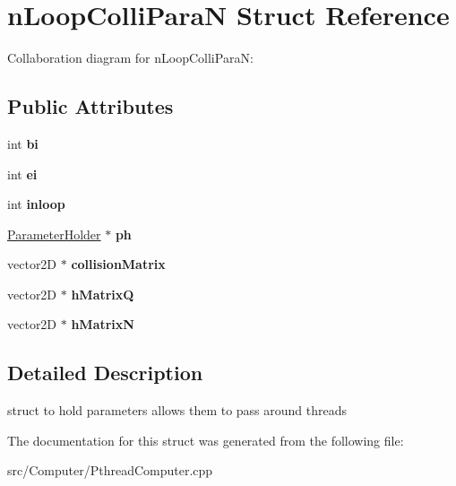 \hypertarget{structnLoopColliParaN}{}\section{n\+Loop\+Colli\+ParaN Struct Reference}
\label{structnLoopColliParaN}


Collaboration diagram for n\+Loop\+Colli\+ParaN\+:
\subsection*{Public Attributes}
\begin{DoxyCompactItemize}
\item 
int {\bfseries bi}\hypertarget{structnLoopColliParaN_acfc0b729c610194a24ee51c3a5d045ce}{}\label{structnLoopColliParaN_acfc0b729c610194a24ee51c3a5d045ce}

\item 
int {\bfseries ei}\hypertarget{structnLoopColliParaN_a264ebf490197649c079bdf6c83507898}{}\label{structnLoopColliParaN_a264ebf490197649c079bdf6c83507898}

\item 
int {\bfseries inloop}\hypertarget{structnLoopColliParaN_a76c7f95e90155290437f87b417b1e4f3}{}\label{structnLoopColliParaN_a76c7f95e90155290437f87b417b1e4f3}

\item 
\hyperlink{structParameterHolder}{Parameter\+Holder} $\ast$ {\bfseries ph}\hypertarget{structnLoopColliParaN_a45f735b665c7590f117a84f88bcb8cba}{}\label{structnLoopColliParaN_a45f735b665c7590f117a84f88bcb8cba}

\item 
vector2D $\ast$ {\bfseries collision\+Matrix}\hypertarget{structnLoopColliParaN_a19af83e40e9ae0d0c61600b274d5d386}{}\label{structnLoopColliParaN_a19af83e40e9ae0d0c61600b274d5d386}

\item 
vector2D $\ast$ {\bfseries h\+MatrixQ}\hypertarget{structnLoopColliParaN_a1cb9af5d87135a844962e3961cf1fd43}{}\label{structnLoopColliParaN_a1cb9af5d87135a844962e3961cf1fd43}

\item 
vector2D $\ast$ {\bfseries h\+MatrixN}\hypertarget{structnLoopColliParaN_ab207d4b41e3da7b53d4827c9e1336c80}{}\label{structnLoopColliParaN_ab207d4b41e3da7b53d4827c9e1336c80}

\end{DoxyCompactItemize}


\subsection{Detailed Description}
struct to hold parameters allows them to pass around threads 

The documentation for this struct was generated from the following file\+:\begin{DoxyCompactItemize}
\item 
src/\+Computer/Pthread\+Computer.\+cpp\end{DoxyCompactItemize}
